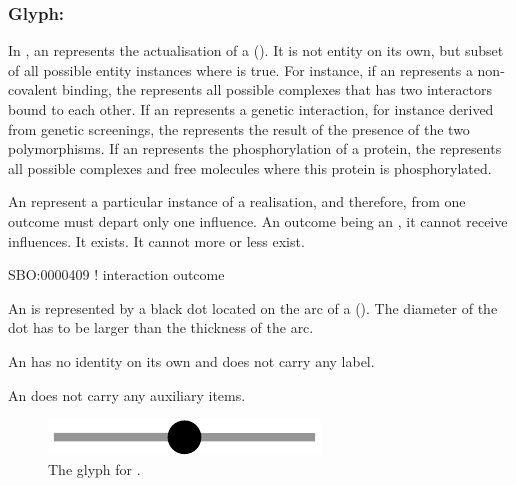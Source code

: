 
\subsubsection{Glyph: }\label{sec:outcome}

In \ERs, an  represents the actualisation of a  (). It is not entity on its own, but subset of all possible entity instances where   is true. For instance, if an  represents a non-covalent binding, the  represents all possible complexes that has two interactors bound to each other. If an  represents a genetic interaction, for instance derived from genetic screenings, the  represents the result of the presence of the two polymorphisms. If an  represents the phosphorylation of a protein, the  represents all possible complexes and free molecules where this protein is phosphorylated.

An  represent a particular instance of a realisation, and therefore, from one outcome must depart only one influence. An outcome being an , it cannot receive influences. It exists. It cannot more or less exist. 

\begin{glyphDescription}

\glyphSboTerm SBO:0000409 ! interaction outcome

\glyphContainer  An  is represented by a black dot located on the arc of a  (). The diameter of the dot has to be larger than the thickness of the arc.

\glyphLabel An  has no identity on its own and does not carry any label. 

\glyphAux An  does not carry any auxiliary items.

\end{glyphDescription}

\begin{figure}[H]
  \centering
  \includegraphics[scale = 0.5]{images/outcome}
  \caption{The \ER glyph for .}
  \label{fig:outcome}
\end{figure}

